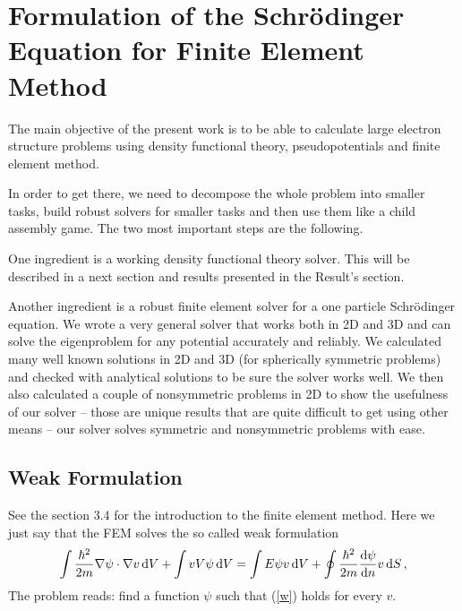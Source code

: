 \section{Formulation of the Schr\"odinger Equation for Finite Element Method}

The main objective of the present work is to be able to calculate large
electron structure problems using density functional theory, pseudopotentials
and finite element method.

In order to get there, we need to decompose the whole problem into smaller
tasks, build robust solvers for smaller tasks and then use them like a child
assembly game. The two most important steps are the following.

One ingredient is a working density functional theory solver. This will be
described in a next section and results presented in the Result's section.

Another ingredient is a robust finite element solver for a one particle
Schr\"odinger equation. We wrote a very general solver that works both in 2D
and 3D and can solve the eigenproblem for any potential accurately and
reliably. We calculated many well known solutions in 2D and 3D (for spherically
symmetric problems) and checked with analytical solutions to be sure the solver
works well. We then also calculated a couple of nonsymmetric problems in 2D to
show the usefulness of our solver -- those are unique results that are quite
difficult to get using other means -- our solver solves symmetric and
nonsymmetric problems with ease.

\subsection{Weak Formulation}

See the section 3.4 for the introduction to the finite element method. Here we
just say that the FEM solves the so called weak formulation
\begin{equation}
  \int{\hbar^2\over2m}\nabla\psi\cdot\nabla v\,{\rm d} V+ \int vV\psi\,{\rm d} V = \int E\psi v\,{\rm d} V + \oint{\hbar^2\over2m}{{\rm d}\psi\over{\rm d}n}v\,{\rm d} S\,,  \label{w}
\end{equation}
The problem reads: find a function $\psi$ such that (\ref{w}) holds for every $v$.

